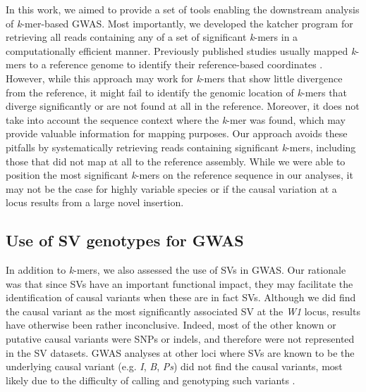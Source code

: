 In this work, we aimed to provide a set of tools enabling the downstream
analysis of \emph{k}-mer-based GWAS. Most importantly, we developed the
katcher program for retrieving all reads containing
any of a set of significant \emph{k}-mers in a computationally efficient manner. Previously published studies usually
mapped \emph{k}-mers to a reference genome to identify their reference-based
coordinates \citep[e.g.][]{voichek2020, he2021, rahman2018, tripodi2021}.
However, while this approach may work for \emph{k}-mers that show little
divergence from the reference, it might fail to identify the genomic location
of \emph{k}-mers that diverge significantly or are not found at all in the
reference. Moreover, it does not take into account the sequence context where
the \emph{k}-mer was found, which may provide valuable information for mapping
purposes. Our approach avoids these pitfalls by systematically retrieving reads
containing significant \emph{k}-mers, including those that did not map at all
to the reference assembly. While we were able to position the most significant
\emph{k}-mers on the reference sequence in our analyses, it may not be the case
for highly variable species or if the causal variation at a locus results from
a large novel insertion.

\subsection*{Use of SV genotypes for GWAS}
\label{use-of-svs-for-gwas}

In addition to \emph{k}-mers, we also assessed the use of SVs in GWAS. Our
rationale was that since SVs have an important functional impact, they may
facilitate the identification of causal variants when these are in fact SVs.
Although we did find the causal variant as the most significantly associated SV
at the \emph{W1} locus, results have otherwise been rather inconclusive.
Indeed, most of the other known or putative causal variants were SNPs or
indels, and therefore were not represented in the SV datasets. GWAS analyses at
other loci where SVs are known to be the underlying causal variant (e.g.
\emph{I}, \emph{B}, \emph{Ps}) did not find the causal variants, most likely
due to the difficulty of calling and genotyping such variants
\citep{kosugi2019, lemay2022}.

